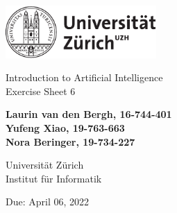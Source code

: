 \documentclass[12pt]{article}
\begin{document}
\begin{titlepage}
\includegraphics[height=20mm]{../images/uzh_logo}\\

\begin{flushleft}

\vspace{2cm}

{\Large Introduction to Artificial Intelligence\\Exercise Sheet 6}\\

\vspace{4cm}

\textbf{Laurin van den Bergh, 16-744-401\\Yufeng Xiao, 19-763-663\\Nora Beringer, 19-734-227}\\

\vspace{2cm}

Universität Zürich\\
Institut für Informatik

\vfill Due: April 06, 2022

\vspace{3cm}


\end{flushleft}
\end{titlepage}

\newpage
\end{document}
